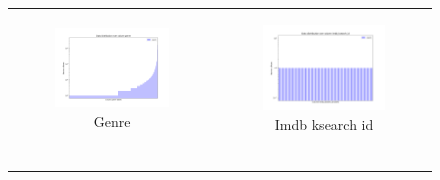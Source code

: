 \begin{figure}
{\begin{tabular}[c]{cc}
     \begin{subfigure}[c]{0.45\textwidth}
         \centering
         \includegraphics[width=\textwidth]{assets/results/dbpediaProfiles/distribution/genre.png}
         \caption{Genre}
         \label{}
     \end{subfigure} &
     \begin{subfigure}[c]{0.45\textwidth}
         \centering
         \includegraphics[width=\textwidth]{assets/results/dbpediaProfiles/distribution/imdb_ksearch_id.png}
         \caption{Imdb ksearch id}
         \label{}
     \end{subfigure} \\
     \begin{subfigure}[c]{0.45\textwidth}
         \centering

\end{subfigure}
\end{tabular}}
\end{figure}
